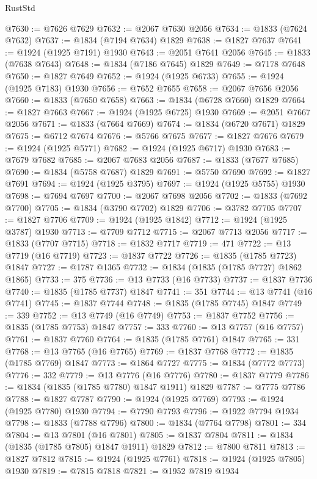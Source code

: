 \begin{lexlean}{RustStd}
\begin{coremodule}
{\begin{coremodule}
{{{{{@7630 := @7626 @7629
@7632 := @2067 @7630 @2056
@7634 := @1833 (@7624 @7632)
@7637 := @1834 (@7194 @7634) @1829
@7638 := @1827 @7637
@7641 := @1924 (@1925 @7191) @1930
@7643 := @2051 @7641 @2056
@7645 := @1833 (@7638 @7643)
@7648 := @1834 (@7186 @7645) @1829
@7649 := @7178 @7648
@7650 := @1827 @7649
@7652 := @1924 (@1925 @6733)
@7655 := @1924 (@1925 @7183) @1930
@7656 := @7652 @7655
@7658 := @2067 @7656 @2056
@7660 := @1833 (@7650 @7658)
@7663 := @1834 (@6728 @7660) @1829
@7664 := @1827 @7663
@7667 := @1924 (@1925 @6725) @1930
@7669 := @2051 @7667 @2056
@7671 := @1833 (@7664 @7669)
@7674 := @1834 (@6720 @7671) @1829
@7675 := @6712 @7674
@7676 := @5766 @7675
@7677 := @1827 @7676
@7679 := @1924 (@1925 @5771)
@7682 := @1924 (@1925 @6717) @1930
@7683 := @7679 @7682
@7685 := @2067 @7683 @2056
@7687 := @1833 (@7677 @7685)
@7690 := @1834 (@5758 @7687) @1829
@7691 := @5750 @7690
@7692 := @1827 @7691
@7694 := @1924 (@1925 @3795)
@7697 := @1924 (@1925 @5755) @1930
@7698 := @7694 @7697
@7700 := @2067 @7698 @2056
@7702 := @1833 (@7692 @7700)
@7705 := @1834 (@3790 @7702) @1829
@7706 := @3782 @7705
@7707 := @1827 @7706
@7709 := @1924 (@1925 @1842)
@7712 := @1924 (@1925 @3787) @1930
@7713 := @7709 @7712
@7715 := @2067 @7713 @2056
@7717 := @1833 (@7707 @7715)
@7718 := @1832 @7717
@7719 := 471
@7722 := @13 @7719 (@16 @7719)
@7723 := @1837 @7722
@7726 := @1835 (@1785 @7723) @1847
@7727 := @1787 @1365
@7732 := @1834 (@1835 (@1785 @7727) @1862 @1865)
@7733 := 375
@7736 := @13 @7733 (@16 @7733)
@7737 := @1837 @7736
@7740 := @1835 (@1785 @7737) @1847
@7741 := 351
@7744 := @13 @7741 (@16 @7741)
@7745 := @1837 @7744
@7748 := @1835 (@1785 @7745) @1847
@7749 := 339
@7752 := @13 @7749 (@16 @7749)
@7753 := @1837 @7752
@7756 := @1835 (@1785 @7753) @1847
@7757 := 333
@7760 := @13 @7757 (@16 @7757)
@7761 := @1837 @7760
@7764 := @1835 (@1785 @7761) @1847
@7765 := 331
@7768 := @13 @7765 (@16 @7765)
@7769 := @1837 @7768
@7772 := @1835 (@1785 @7769) @1847
@7773 := @1864 @7727
@7775 := @1834 (@7772 @7773)
@7776 := 332
@7779 := @13 @7776 (@16 @7776)
@7780 := @1837 @7779
@7786 := @1834 (@1835 (@1785 @7780) @1847 @1911) @1829
@7787 := @7775 @7786
@7788 := @1827 @7787
@7790 := @1924 (@1925 @7769)
@7793 := @1924 (@1925 @7780) @1930
@7794 := @7790 @7793
@7796 := @1922 @7794 @1934
@7798 := @1833 (@7788 @7796)
@7800 := @1834 (@7764 @7798)
@7801 := 334
@7804 := @13 @7801 (@16 @7801)
@7805 := @1837 @7804
@7811 := @1834 (@1835 (@1785 @7805) @1847 @1911) @1829
@7812 := @7800 @7811
@7813 := @1827 @7812
@7815 := @1924 (@1925 @7761)
@7818 := @1924 (@1925 @7805) @1930
@7819 := @7815 @7818
@7821 := @1952 @7819 @1934
}}}}}
\end{coremodule}}
\end{coremodule}
\end{lexlean}
